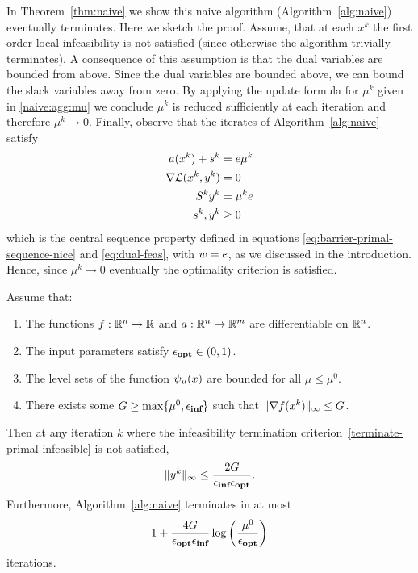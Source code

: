 \documentclass{article}
\begin{document}
In Theorem~\ref{thm:naive} we show this naive algorithm (Algorithm~\ref{alg:naive}) eventually terminates. Here we sketch the proof. Assume, that at each $x^{k}$ the first order local infeasibility is not satisfied (since otherwise the algorithm trivially terminates). A consequence of this assumption is that the dual variables are bounded from above. Since the dual variables are bounded above, we can bound the slack variables away from zero. By applying the update formula for $\mu^{k}$ given in \eqref{naive:agg:mu} we conclude $\mu^{k}$ is reduced sufficiently at each iteration and therefore $\mu^{k} \rightarrow 0$. Finally, observe that the iterates of Algorithm~\ref{alg:naive} satisfy
\begin{subequations}
\begin{flalign}
a(x^{k}) + s^{k} &= e \mu^k \\
\nabla \mathcal{L}(x^{k}, y^{k}) &= 0 \\
S^{k} y^{k} &= \mu^k e \\
s^{k}, y^{k} &\ge 0
\end{flalign}
\end{subequations}
which is the central sequence property defined in equations \eqref{eq:barrier-primal-sequence-nice} and \eqref{eq:dual-feas}, with $w = e$, as we discussed in the introduction. Hence, since $\mu^k \rightarrow 0$ eventually the optimality criterion is satisfied.


\begin{theorem}\label{thm:naive}
Assume that: 
\begin{enumerate}
\item The functions $f : \mathbb{R}^{n} \rightarrow \mathbb{R}$ and $a : \mathbb{R}^{n} \rightarrow \mathbb{R}^{m}$ are differentiable on $\mathbb{R}^{n}$.
\item The input parameters satisfy $\epsilon_{\textbf{opt}} \in (0, 1)$. %
\item The level sets of the function $\psi_{\mu}(x)$ are bounded for all $\mu \le \mu^{0}$.
\item There exists some $G \ge \max\{ \mu^{0}, \epsilon_{\textbf{inf}} \}$ such that $\| \nabla f(x^k) \|_{\infty} \le G$.
\end{enumerate}
Then at any iteration $k$ where the infeasibility termination criterion~\eqref{terminate-primal-infeasible} is not satisfied,
$$
\| y^{k} \|_{\infty} \le \frac{2 G}{ \epsilon_{\textbf{inf}} \epsilon_{\textbf{opt}}}.
$$
Furthermore, Algorithm~\ref{alg:naive} terminates in at most 
$$
1 + \frac{4 G}{\epsilon_{\textbf{opt}} \epsilon_{\textbf{inf}} } \log\left( \frac{\mu^{0}}{\epsilon_{\textbf{opt}}} \right)
$$
iterations.
\end{theorem}
\end{document}
